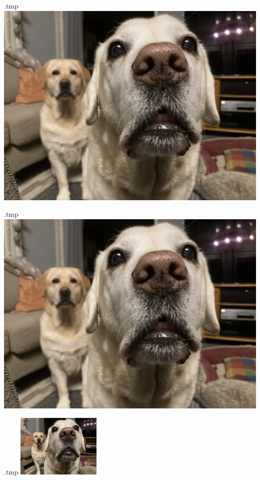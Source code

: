\begin{VerbatimOut}{\jobname.tmp}
\includegraphics[bb=2.3cm 1.4cm 7cm 6cm,clip]
    {pictures/TheDogs.jpg}
\end{VerbatimOut}
\ShowExample
%
\begin{VerbatimOut}{\jobname.tmp}
\includegraphics[totalheight=3cm, angle=45]
    {pictures/TheDogs.jpg}
\end{VerbatimOut}
\ShowExample
%
\begin{VerbatimOut}{\jobname.tmp}
\includegraphics[height=3cm, draft]
    {pictures/TheDogs.jpg}
\end{VerbatimOut}
\ShowExample

